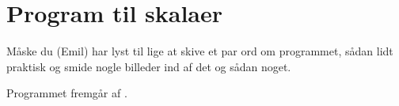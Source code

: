 \section{Program til skalaer}
\label{TestAfSkalaProgramSkala}
%
Måske du (Emil) har lyst til lige at skive et par ord om programmet, sådan lidt praktisk og smide nogle billeder ind af det og sådan noget. 

Programmet fremgår af .